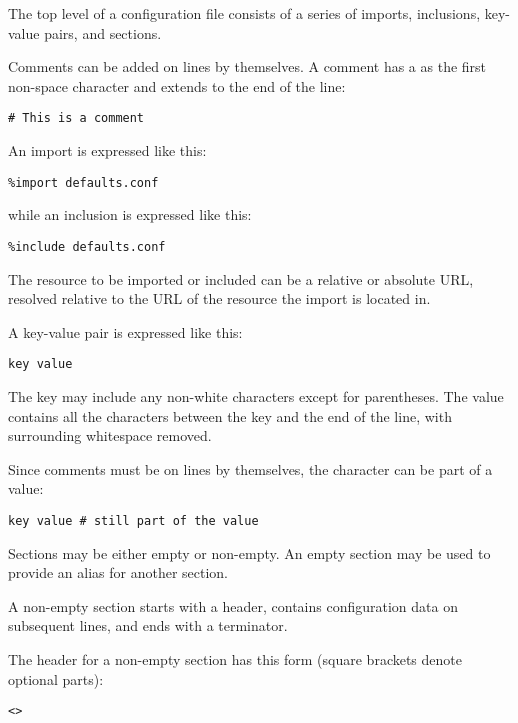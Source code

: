 \documentclass{howto}
\begin{document}
The top level of a configuration file consists of a series of imports,
inclusions, key-value pairs, and sections.

Comments can be added on lines by themselves.  A comment has a
\character{\#} as the first non-space character and extends to the end
of the line:

\begin{verbatim}
# This is a comment
\end{verbatim}

An import is expressed like this:

\begin{verbatim}
%import defaults.conf
\end{verbatim}

while an inclusion is expressed like this:

\begin{verbatim}
%include defaults.conf
\end{verbatim}

The resource to be imported or included can be a relative or absolute
URL, resolved relative to the URL of the resource the import is
located in.


A key-value pair is expressed like this:

\begin{verbatim}
key value
\end{verbatim}

The key may include any non-white characters except for parentheses.
The value contains all the characters between the key and the end of
the line, with surrounding whitespace removed.

Since comments must be on lines by themselves, the \character{\#}
character can be part of a value:

\begin{verbatim}
key value # still part of the value
\end{verbatim}

Sections may be either empty or non-empty.  An empty section may be
used to provide an alias for another section.

A non-empty section starts with a header, contains configuration
data on subsequent lines, and ends with a terminator.

The header for a non-empty section has this form (square brackets
denote optional parts):

\begin{alltt}
<   >
\end{alltt}
\end{document}
